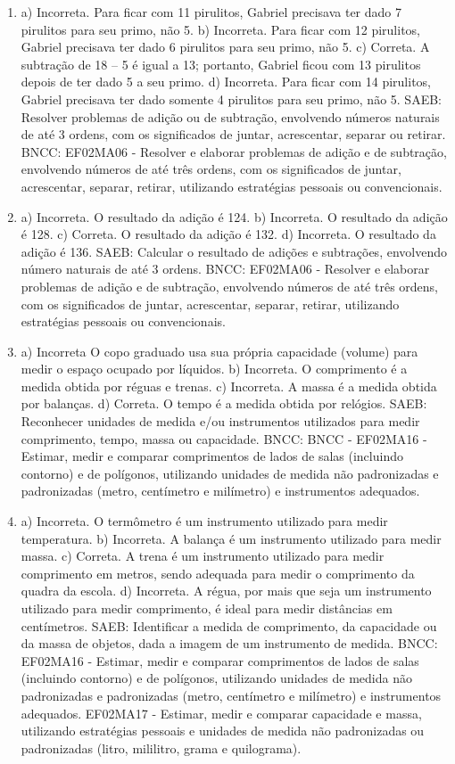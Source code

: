 \begin{enumerate}
\item
a) Incorreta. Para ficar com 11 pirulitos, Gabriel precisava ter dado 7
pirulitos para seu primo, não 5.
b) Incorreta. Para ficar com 12 pirulitos, Gabriel precisava ter dado 6
pirulitos para seu primo, não 5.
c) Correta. A subtração de 18 -- 5 é igual a 13; portanto, Gabriel ficou
com 13 pirulitos depois de ter dado 5 a seu primo.
d) Incorreta. Para ficar com 14 pirulitos, Gabriel precisava ter dado
somente 4 pirulitos para seu primo, não 5.
SAEB: Resolver problemas de adição ou de subtração, envolvendo
números naturais de até 3 ordens, com os significados de juntar,
acrescentar, separar ou retirar.
BNCC: EF02MA06 - Resolver e elaborar problemas de adição e de subtração,
envolvendo números de até três ordens, com os significados de juntar,
acrescentar, separar, retirar, utilizando estratégias pessoais ou convencionais.

\item
a) Incorreta. O resultado da adição é 124.
b) Incorreta. O resultado da adição é 128.
c) Correta. O resultado da adição é 132.
d) Incorreta. O resultado da adição é 136.
SAEB: Calcular o resultado de adições e subtrações, envolvendo
número naturais de até 3 ordens.
BNCC: EF02MA06 - Resolver e elaborar problemas de adição e de subtração,
envolvendo números de até três ordens, com os significados de juntar,
acrescentar, separar, retirar, utilizando estratégias pessoais ou
convencionais.

\item
a) Incorreta O copo graduado usa sua própria capacidade (volume) para
medir o espaço ocupado por líquidos.
b) Incorreta. O comprimento é a medida obtida por réguas e trenas.
c) Incorreta. A massa é a medida obtida por balanças.
d) Correta. O tempo é a medida obtida por relógios.
SAEB: Reconhecer unidades de medida e/ou instrumentos utilizados
para medir comprimento, tempo, massa ou capacidade.
BNCC: BNCC - EF02MA16 - Estimar, medir e comparar comprimentos de lados
de salas (incluindo contorno) e de polígonos, utilizando unidades de
medida não padronizadas e padronizadas (metro, centímetro e milímetro) e
instrumentos adequados.

\item
a) Incorreta. O termômetro é um instrumento utilizado para medir temperatura.
b) Incorreta. A balança é um instrumento utilizado para medir massa.
c) Correta. A trena é um instrumento utilizado para medir comprimento
em metros, sendo adequada para medir o comprimento da quadra da escola.
d) Incorreta. A régua, por mais que seja um instrumento utilizado para
medir comprimento, é ideal para medir distâncias em centímetros.
SAEB: Identificar a medida de comprimento, da capacidade ou da
massa de objetos, dada a imagem de um instrumento de medida.
BNCC: EF02MA16 - Estimar, medir e comparar comprimentos de lados de
salas (incluindo contorno) e de polígonos, utilizando unidades de medida
não padronizadas e padronizadas (metro, centímetro e milímetro) e
instrumentos adequados. EF02MA17 - Estimar, medir e comparar capacidade
e massa, utilizando estratégias pessoais e unidades de medida não
padronizadas ou padronizadas (litro, mililitro, grama e quilograma).


\end{enumerate}
